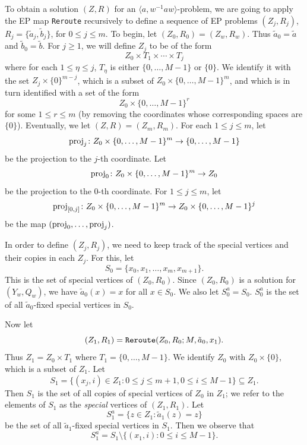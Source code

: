 \documentclass[10pt,a4paper]{amsart}
\theoremstyle{definition}
\theoremstyle{definition}
\numberwithin{equation}{section}
\begin{document}
To obtain a solution $(Z, R)$ for an $\langle a, w^{-1}aw\rangle$-problem, we are going to apply the EP map {\tt Reroute} recursively to define a sequence of EP problems $(Z_j, R_j)$, $R_j=\{\tilde{a}_j, \tilde{b}_j\}$, for $0\leq j\leq m$. To begin, let $(Z_0, R_0)=(Z_w, R_w)$. Thus $\tilde{a}_0=\tilde{a}$ and $\tilde{b}_0=\tilde{b}$. For $j\geq 1$, we will define $Z_j$ to be of the form
$$ Z_0\times T_1\times \cdots \times T_j $$
where for each $1\leq\eta\leq j$, $T_\eta$ is either $\{0, \dots, M-1\}$ or $\{0\}$. We identify it with the set $Z_j\times \{0\}^{m-j}$, which is a subset of $Z_0\times \{0, \dots, M-1\}^m$, and which is in turn identified with a set of the form
$$ Z_0\times \{0, \dots, M-1\}^r $$
for some $1\leq r\leq m$ (by removing the coordinates whose corresponding spaces are $\{0\}$). 
Eventually, we let $(Z, R)=(Z_m, R_m)$. For each $1\leq j\leq m$, let $$\mbox{\rm proj}_j\colon Z_0\times \{0, \dots, M-1\}^m\to \{0, \dots, M-1\}$$ be the projection to the $j$-th coordinate. Let $$\mbox{\rm proj}_0\colon Z_0\times \{0, \dots, M-1\}^m\to Z_0$$ be the projection to the $0$-th coordinate. For $1\leq j\leq m$, let
$$ \mbox{\rm proj}_{[0,j]}\colon Z_0\times \{0, \dots, M-1\}^m\to Z_0\times \{0, \dots, M-1\}^j $$
be the map $(\mbox{\rm proj}_0, \dots, \mbox{\rm proj}_{j})$.

In order to define $(Z_j, R_j)$, we need to keep track of the special vertices and their copies in each $Z_j$. For this, let 
$$ S_0=\{x_0, x_1, \dots, x_m, x_{m+1}\}. $$
This is the set of special vertices of $(Z_0, R_0)$. Since $(Z_0, R_0)$ is a solution for $(Y_w, Q_w)$, we have $\tilde{a}_0(x)=x$ for all $x\in S_0$. We also let $S_0^a=S_0$. $S_0^a$ is the set of all $\tilde{a}_0$-fixed special vertices in $S_0$. 

Now let 
$$ (Z_1, R_1)=\mbox{\tt Reroute}(Z_0, R_0; M, \tilde{a}_0, x_1). $$
Thus $Z_1=Z_0\times T_1$ where $T_1=\{0, \dots, M-1\}$. We identify $Z_0$ with $Z_0\times\{0\}$, which is a subset of $Z_1$. 
Let 
$$ S_1=\{(x_j, i)\in Z_1\colon 0\leq j\leq m+1, 0\leq i\leq M-1\}\subseteq Z_1. $$
Then $S_1$ is the set of all copies of special vertices of $Z_0$ in $Z_1$; we refer to the elements of $S_1$ as the {\em special} vertices of $(Z_1, R_1)$. Let 
$$ S_1^a=\{z\in Z_1\colon \tilde{a}_1(z)=z\} $$
be the set of all $\tilde{a}_1$-fixed special vertices in $S_1$. Then we observe that
$$ S_1^a=S_1\setminus \{(x_1,i)\colon 0\leq i\leq M-1\}. $$
\end{document}
